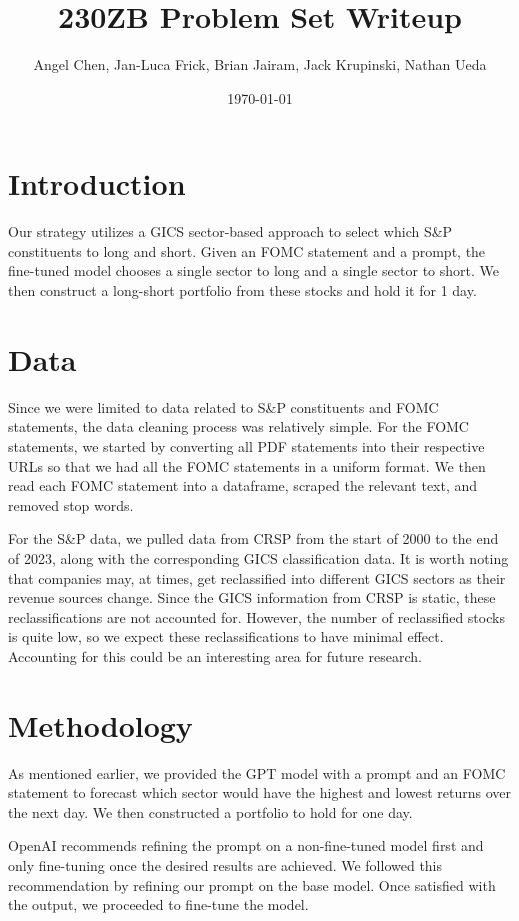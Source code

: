 \documentclass[11pt]{article}
\title{230ZB Problem Set Writeup}
\author{Angel Chen, Jan-Luca Frick, Brian Jairam, Jack Krupinski, Nathan Ueda}
\date{\today}
\begin{document}
\maketitle 
\pagebreak

\section{Introduction}
Our strategy utilizes a GICS sector-based approach to select which S\&P constituents 
to long and short. Given an FOMC statement and a prompt, the fine-tuned model chooses 
a single sector to long and a single sector to short. We then construct a long-short 
portfolio from these stocks and hold it for 1 day.

\section{Data}

Since we were limited to data related to S\&P constituents and FOMC statements, 
the data cleaning process was relatively simple. For the FOMC statements, we started 
by converting all PDF statements into their respective URLs so that we had all the 
FOMC statements in a uniform format. We then read each FOMC statement into a dataframe, 
scraped the relevant text, and removed stop words.

    For the S\&P data, we pulled data from CRSP from the start of 2000 to the end of 2023, 
along with the corresponding GICS classification data. It is worth noting that companies may, 
at times, get reclassified into different GICS sectors as their revenue sources change. Since the 
GICS information from CRSP is static, these reclassifications are not accounted for. However, 
the number of reclassified stocks is quite low, so we expect these reclassifications to have 
minimal effect. Accounting for this could be an interesting area for future research.

\section{Methodology}
As mentioned earlier, we provided the GPT model with a prompt and an FOMC statement to 
forecast which sector would have the highest and lowest returns over the next day. We 
then constructed a portfolio to hold for one day.

    OpenAI recommends refining the prompt on a non-fine-tuned model first and only fine-tuning once 
the desired results are achieved. We followed this recommendation by refining our prompt on 
the base model. Once satisfied with the output, we proceeded to fine-tune the model.
\end{document}
